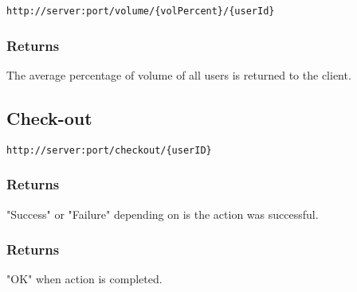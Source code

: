 \begin{lstlisting}[label={lst:endpoint_volume}, caption={Text surrounded by curly brackets are parameters.}]
http://server:port/volume/{volPercent}/{userId}
\end{lstlisting}

\subsubsection{Returns}
The average percentage of volume of all users is returned to the client.

\subsection{Check-out}

\begin{lstlisting}[label={lst:endpoint_checkout}, caption={Text surrounded by curly brackets are parameters.}]
http://server:port/checkout/{userID}
\end{lstlisting}

\subsubsection{Returns}
"Success" or "Failure" depending on is the action was successful.

\subsubsection{Returns}
"OK" when action is completed.

